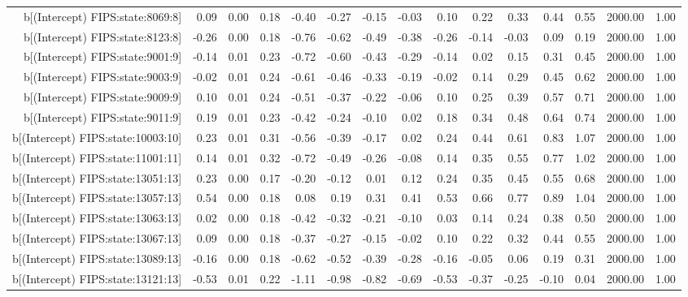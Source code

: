 \begin{table}[ht]
\begin{tabular}{rrrrrrrrrrrrrrr}
  b[(Intercept) FIPS:state:8069:8] & 0.09 & 0.00 & 0.18 & -0.40 & -0.27 & -0.15 & -0.03 & 0.10 & 0.22 & 0.33 & 0.44 & 0.55 & 2000.00 & 1.00 \\ 
  b[(Intercept) FIPS:state:8123:8] & -0.26 & 0.00 & 0.18 & -0.76 & -0.62 & -0.49 & -0.38 & -0.26 & -0.14 & -0.03 & 0.09 & 0.19 & 2000.00 & 1.00 \\ 
  b[(Intercept) FIPS:state:9001:9] & -0.14 & 0.01 & 0.23 & -0.72 & -0.60 & -0.43 & -0.29 & -0.14 & 0.02 & 0.15 & 0.31 & 0.45 & 2000.00 & 1.00 \\ 
  b[(Intercept) FIPS:state:9003:9] & -0.02 & 0.01 & 0.24 & -0.61 & -0.46 & -0.33 & -0.19 & -0.02 & 0.14 & 0.29 & 0.45 & 0.62 & 2000.00 & 1.00 \\ 
  b[(Intercept) FIPS:state:9009:9] & 0.10 & 0.01 & 0.24 & -0.51 & -0.37 & -0.22 & -0.06 & 0.10 & 0.25 & 0.39 & 0.57 & 0.71 & 2000.00 & 1.00 \\ 
  b[(Intercept) FIPS:state:9011:9] & 0.19 & 0.01 & 0.23 & -0.42 & -0.24 & -0.10 & 0.02 & 0.18 & 0.34 & 0.48 & 0.64 & 0.74 & 2000.00 & 1.00 \\ 
  b[(Intercept) FIPS:state:10003:10] & 0.23 & 0.01 & 0.31 & -0.56 & -0.39 & -0.17 & 0.02 & 0.24 & 0.44 & 0.61 & 0.83 & 1.07 & 2000.00 & 1.00 \\ 
  b[(Intercept) FIPS:state:11001:11] & 0.14 & 0.01 & 0.32 & -0.72 & -0.49 & -0.26 & -0.08 & 0.14 & 0.35 & 0.55 & 0.77 & 1.02 & 2000.00 & 1.00 \\ 
  b[(Intercept) FIPS:state:13051:13] & 0.23 & 0.00 & 0.17 & -0.20 & -0.12 & 0.01 & 0.12 & 0.24 & 0.35 & 0.45 & 0.55 & 0.68 & 2000.00 & 1.00 \\ 
  b[(Intercept) FIPS:state:13057:13] & 0.54 & 0.00 & 0.18 & 0.08 & 0.19 & 0.31 & 0.41 & 0.53 & 0.66 & 0.77 & 0.89 & 1.04 & 2000.00 & 1.00 \\ 
  b[(Intercept) FIPS:state:13063:13] & 0.02 & 0.00 & 0.18 & -0.42 & -0.32 & -0.21 & -0.10 & 0.03 & 0.14 & 0.24 & 0.38 & 0.50 & 2000.00 & 1.00 \\ 
  b[(Intercept) FIPS:state:13067:13] & 0.09 & 0.00 & 0.18 & -0.37 & -0.27 & -0.15 & -0.02 & 0.10 & 0.22 & 0.32 & 0.44 & 0.55 & 2000.00 & 1.00 \\ 
  b[(Intercept) FIPS:state:13089:13] & -0.16 & 0.00 & 0.18 & -0.62 & -0.52 & -0.39 & -0.28 & -0.16 & -0.05 & 0.06 & 0.19 & 0.31 & 2000.00 & 1.00 \\ 
  b[(Intercept) FIPS:state:13121:13] & -0.53 & 0.01 & 0.22 & -1.11 & -0.98 & -0.82 & -0.69 & -0.53 & -0.37 & -0.25 & -0.10 & 0.04 & 2000.00 & 1.00 \\ 

\end{tabular}
\end{table}
